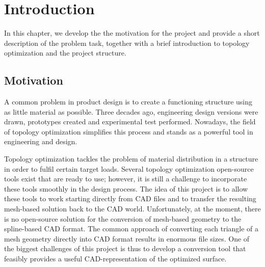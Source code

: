 \chapter{Introduction}
\label{chapter:Introduction}
In this chapter, we develop the the motivation for the project and provide a short description of the problem task, together with a brief introduction to topology optimization and the project structure.
\section{Motivation}
A common problem in product design is to create a functioning structure using as little material as possible. Three decades ago, engineering design versions were drawn, prototypes created and experimental test performed. Nowadays, the field of topology optimization simplifies this process and stands as a powerful tool in engineering and design.

Topology optimization tackles the problem of material distribution in a structure in order to fulfil certain target loads. Several topology optimization open-source tools exist that are ready to use; however, it is still a challenge to incorporate these tools smoothly in the design process. The idea of this project is to allow these tools to work starting directly from \acf{CAD} files and to transfer the resulting mesh-based solution back to the \ac{CAD} world. Unfortunately, at the moment, there is no open-source solution for the conversion of mesh-based geometry to the spline-based \ac{CAD} format. The common approach of converting each triangle of a mesh geometry directly into \ac{CAD} format results in enormous file sizes. One of the biggest challenges of this project is thus to develop a conversion tool that feasibly provides a useful \ac{CAD}-representation of the optimized surface.


%
%

